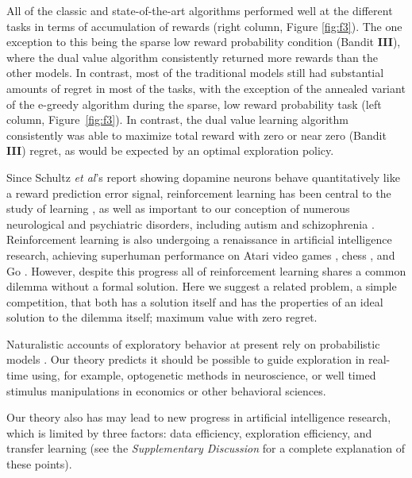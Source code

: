 \documentclass[12pt]{article}
\begin{document}
All of the classic and state-of-the-art algorithms performed well at the different tasks in terms of accumulation of rewards (right column, Figure \ref{fig:f3}). The one exception to this being the sparse low reward probability condition (Bandit \textbf{III}), where the dual value algorithm consistently returned more rewards than the other models. In contrast, most of the traditional models still had substantial amounts of regret in most of the tasks, with the exception of the annealed variant of the e-greedy algorithm during the sparse, low reward probability task (left column, Figure~\ref{fig:f3}). In contrast, the dual value learning algorithm consistently was able to maximize total reward with zero or near zero (Bandit \textbf{III}) regret, as would be expected by an optimal exploration policy.

Since Schultz \textit{et al}’s \cite{Schultz1998} report showing dopamine neurons behave quantitatively like a reward prediction error signal, reinforcement learning has been central to the study of learning \cite{Neftci2019}, as well as important to our conception of numerous neurological and psychiatric disorders, including autism \cite{Sinha2014} and schizophrenia \cite{Maia2017}. Reinforcement learning is also undergoing a renaissance in artificial intelligence research, achieving superhuman performance on Atari video games \cite{Mnih2015}, chess \cite{Silver2018}, and Go \cite{Silver2016}. However, despite this progress all of reinforcement learning shares a common dilemma without a formal solution. Here we suggest a related problem, a simple competition, that both has a solution itself and has the properties of an ideal solution to the dilemma itself; maximum value with zero regret. 

Naturalistic accounts of exploratory behavior at present rely on probabilistic models \cite{Calhoun2014,Song2019a,Gershman2018b,Schulz2018a}. Our theory predicts it should be possible to guide exploration in real-time using, for example, optogenetic methods in neuroscience, or well timed stimulus manipulations in economics or other behavioral sciences.

Our theory also has may lead to new progress in artificial intelligence research, which is limited by three factors: data efficiency, exploration efficiency, and transfer learning \cite{Sutton2018,Ha2018,Kulkarni2016a} (see the \textit{Supplementary Discussion} for a complete explanation of these points).
\end{document}
